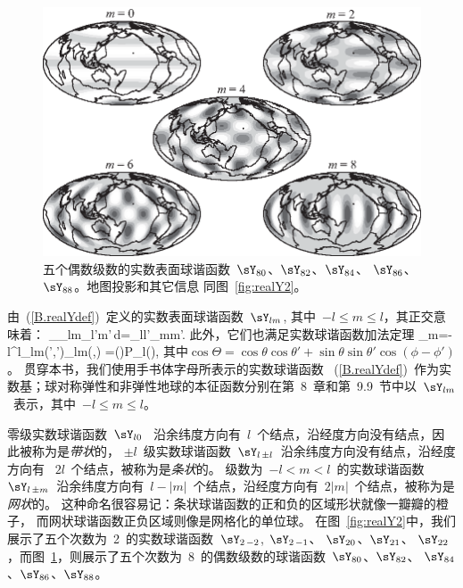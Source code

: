\begin{figure}[!b]
\begin{center}
\includegraphics{../figures/appendixB/fig02.eps}
\end{center}
\caption[Real Y8m]{\label{fig:realY8}
五个偶数级数的实数表面球谐函数~$\sY_{80}$、$\sY_{82}$、$\sY_{84}$、 $\sY_{86}$、$\sY_{88}$。地图投影和其它信息
同图~\ref{fig:realY2}。}
\end{figure}
由~(\ref{B.realYdef})~定义的实数表面球谐函数~$\sY_{lm}$, 其中~$-l\leq m\leq l$，其正交意味着：
\eq \label{B.realnorm}
\int_\Omega \sY_{lm}\sY_{l'm'}\,d\Om=\delta_{ll'}\delta_{mm'}.
\en
此外，它们也满足实数球谐函数加法定理
%
\eq \label{B.realaddth}
\sum_{m=-l}^l\sY_{lm}(\theta',\phi')\sY_{lm}(\theta,\phi)
=\left(\right)P_l(\cos\Theta),
\en
其中$\cos\Theta=\cos\theta\cos\theta'+
\sin\theta\sin\theta'\cos(\phi-\phi')$。
贯穿本书，我们使用手书体字母所表示的实数球谐函数
~(\ref{B.realYdef})~作为实数基；球对称弹性和非弹性地球的本征函数分别在第~8~章和第~9.9~节中以~$\sY_{lm}$~表示，其中~$-l\leq m\leq l$。

零级实数球谐函数~$\sY_{l0}$~ 沿余纬度方向有~$l$~个结点，沿经度方向没有结点，因此被称为是{\em 带状\/}的，
%
%
$\pm l$~级实数球谐函数~$\sY_{l\,\pm l}$~沿余纬度方向没有结点，沿经度方向有~ $2l$~个结点，被称为是{\em 条状\/}的。
%
%
级数为~$-l<m<l$~的实数球谐函数~$\sY_{l\,\pm m}$~沿余纬度方向有~$l-|m|$~个结点，沿经度方向有~$2|m|$~个结点，被称为是{\em 网状\/}的。
%
%
这种命名很容易记：条状球谐函数的正和负的区域形状就像一瓣瓣的橙子，
而网状球谐函数正负区域则像是网格化的单位球。
在图~\ref{fig:realY2}中，我们展示了五个次数为~2~的实数球谐函数~$\sY_{2\,-2}$, $\sY_{2\,-1}$、
$\sY_{20}$、$\sY_{21}$、 $\sY_{22}$，而图~\ref{fig:realY8}，则展示了五个次数为~8~的偶数级数的球谐函数~$\sY_{80}$、$\sY_{82}$、
$\sY_{84}$、$\sY_{86}$、$\sY_{88}$。


